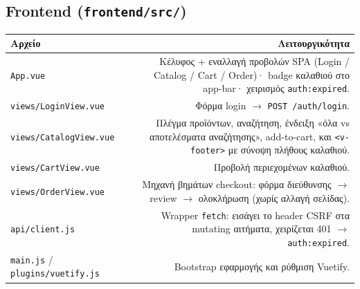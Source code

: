 \documentclass[11pt,a4paper]{article}
\newcommand{\code}[1]{\texttt{#1}}
\begin{document}
\subsection{Frontend (\texttt{frontend/src/})}
\begin{longtable}{@{}L R@{}}
    \toprule
    \textbf{Αρχείο} & \textbf{Λειτουργικότητα} \\
    \midrule
    \code{App.vue} & Κέλυφος + εναλλαγή προβολών SPA (Login / Catalog / Cart / Order)· badge καλαθιού στο app-bar· χειρισμός \code{auth:expired}. \\
    \code{views/LoginView.vue} & Φόρμα login $\rightarrow$ \code{POST /auth/login}. \\
    \code{views/CatalogView.vue} & Πλέγμα προϊόντων, αναζήτηση, ένδειξη «όλα vs αποτελέσματα αναζήτησης», add-to-cart, και \code{<v-footer>} με σύνοψη πλήθους καλαθιού. \\
    \code{views/CartView.vue} & Προβολή περιεχομένων καλαθιού. \\
    \code{views/OrderView.vue} & Μηχανή βημάτων checkout: φόρμα διεύθυνσης $\rightarrow$ review $\rightarrow$ ολοκλήρωση (χωρίς αλλαγή σελίδας). \\
    \code{api/client.js} & Wrapper \code{fetch}: εισάγει το header CSRF στα mutating αιτήματα, χειρίζεται 401 $\rightarrow$ \code{auth:expired}. \\
    \code{main.js} / \code{plugins/vuetify.js} & Bootstrap εφαρμογής και ρύθμιση Vuetify. \\
    \bottomrule
\end{longtable}
\end{document}
